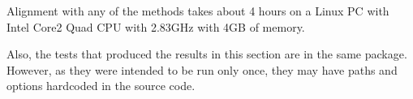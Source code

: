 Alignment with any of the methods takes about 4 hours on a Linux PC with Intel Core2 Quad CPU with 2.83GHz with 4GB of memory.

Also, the tests that produced the results in this section are in the same package. However, as they were intended to be run only once, they may have paths and options hardcoded in the source code.